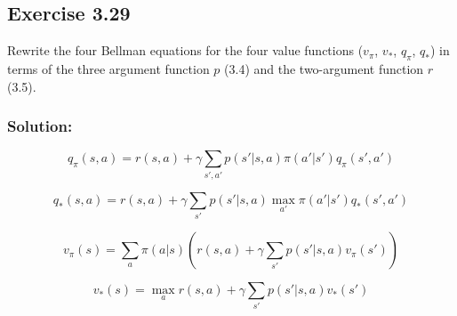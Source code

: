 \subsection*{Exercise 3.29}
Rewrite the four Bellman equations for the four value functions ($v_\pi$, $v_*$, $q_\pi$, $q_*$)
in terms of the three argument function $p$ (3.4) and the two-argument function $r$ (3.5).

\subsubsection*{Solution:}

\[
q_\pi(s,a) = r(s,a) + \gamma \sum_{s',a'} p(s'|s,a) \pi(a'|s') q _\pi(s',a')
\]

\[
    q_*(s,a) = r(s,a) + \gamma  \sum_{s'} p(s'|s,a) \max_{a'} \pi(a'|s') q _*(s',a')
\]

\[
    v_\pi(s) = \sum_a \pi(a|s) \left( r(s,a) + \gamma \sum_{s'} p(s'|s,a) v_\pi(s') \right) 
\]

\[
    v_*(s) = \max_a  r(s,a) + \gamma \sum_{s'} p(s'|s,a) v_*(s') 
\]